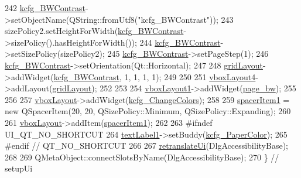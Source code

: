 \begin{DoxyCode}
242         \hyperlink{classUi__DlgAccessibilityBase_a4b034ff4228747708c7eeba77bc58734}{kcfg\_BWContrast}->setObjectName(QString::fromUtf8(\textcolor{stringliteral}{"kcfg\_BWContrast"}));
243         sizePolicy2.setHeightForWidth(\hyperlink{classUi__DlgAccessibilityBase_a4b034ff4228747708c7eeba77bc58734}{kcfg\_BWContrast}->sizePolicy().hasHeightForWidth());
244         \hyperlink{classUi__DlgAccessibilityBase_a4b034ff4228747708c7eeba77bc58734}{kcfg\_BWContrast}->setSizePolicy(sizePolicy2);
245         \hyperlink{classUi__DlgAccessibilityBase_a4b034ff4228747708c7eeba77bc58734}{kcfg\_BWContrast}->setPageStep(1);
246         \hyperlink{classUi__DlgAccessibilityBase_a4b034ff4228747708c7eeba77bc58734}{kcfg\_BWContrast}->setOrientation(Qt::Horizontal);
247 
248         \hyperlink{classUi__DlgAccessibilityBase_a5f8944bbf69c844201c6fbfc3436c89b}{gridLayout}->addWidget(\hyperlink{classUi__DlgAccessibilityBase_a4b034ff4228747708c7eeba77bc58734}{kcfg\_BWContrast}, 1, 1, 1, 1);
249 
250 
251         \hyperlink{classUi__DlgAccessibilityBase_ae920274bca545ba85ff1578ed4317d56}{vboxLayout4}->addLayout(\hyperlink{classUi__DlgAccessibilityBase_a5f8944bbf69c844201c6fbfc3436c89b}{gridLayout});
252 
253 
254         \hyperlink{classUi__DlgAccessibilityBase_a83ac60339f9462b3a0571677794fae95}{vboxLayout1}->addWidget(\hyperlink{classUi__DlgAccessibilityBase_ad6248c8c27f576cedc9e49b6144c4bc4}{page\_bw});
255 
256 
257         \hyperlink{classUi__DlgAccessibilityBase_abb6e3109a50289ea7dd8791e43379d3e}{vboxLayout}->addWidget(\hyperlink{classUi__DlgAccessibilityBase_ad69ec5ae9e5bad5756a57dac036500eb}{kcfg\_ChangeColors});
258 
259         \hyperlink{classUi__DlgAccessibilityBase_a2fa40aa9319045894111f40c872dd4d5}{spacerItem1} = \textcolor{keyword}{new} QSpacerItem(20, 20, QSizePolicy::Minimum, QSizePolicy::Expanding);
260 
261         \hyperlink{classUi__DlgAccessibilityBase_abb6e3109a50289ea7dd8791e43379d3e}{vboxLayout}->addItem(\hyperlink{classUi__DlgAccessibilityBase_a2fa40aa9319045894111f40c872dd4d5}{spacerItem1});
262 
263 \textcolor{preprocessor}{#ifndef UI\_QT\_NO\_SHORTCUT}
264         \hyperlink{classUi__DlgAccessibilityBase_a8487704a7e035affc3a6ef7f80572d21}{textLabel1}->setBuddy(\hyperlink{classUi__DlgAccessibilityBase_ab1e0b4e4d2995754bd22f47faf578f96}{kcfg\_PaperColor});
265 \textcolor{preprocessor}{#endif // QT\_NO\_SHORTCUT}
266 
267         \hyperlink{classUi__DlgAccessibilityBase_a4632d40dde4027283f0f10f641413f35}{retranslateUi}(DlgAccessibilityBase);
268 
269         QMetaObject::connectSlotsByName(DlgAccessibilityBase);
270     \} \textcolor{comment}{// setupUi}
\end{DoxyCode}


